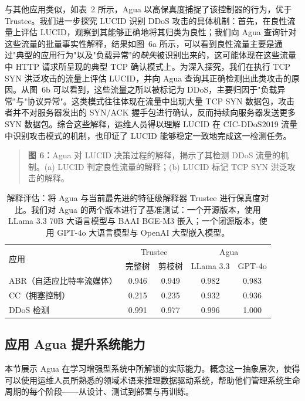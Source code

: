 \documentclass[11pt,a4paper]{article}
\begin{document}
与其他应用类似，如表~2 所示，Agua 以高保真度捕捉了该控制器的行为，优于 Trustee。我们进一步探究 LUCID 识别 DDoS 攻击的具体机制：首先，在良性流量上评估 LUCID，观察到其能够正确地将其归类为良性；我们向 Agua 查询针对这些流量的批量事实性解释，结果如图~6a 所示，可以看到良性流量主要是通过"典型的应用行为"以及"负载异常"的\emph{缺失}被识别出来的，这可能体现在这些流量中 HTTP 请求所呈现的典型 TCP 确认模式上。为深入探究，我们在执行 TCP SYN 洪泛攻击的流量上评估 LUCID，并向 Agua 查询其正确检测出此类攻击的原因。从图~6b 可以看到，这些流量之所以被标记为 DDoS，主要归因于"负载异常"与"协议异常"。这类模式往往体现在流量中出现大量 TCP SYN 数据包，攻击者并不对服务器发出的 SYN/ACK 握手包进行确认，反而持续向服务器发送更多 SYN 数据包。综合这些解释，运维人员得以理解 LUCID 在 CIC-DDoS2019 流量中识别攻击模式的机制，也印证了 LUCID 能够稳定一致地完成这一检测任务。

\begin{quote}\small\noindent\textbf{图 6：}Agua 对 LUCID 决策过程的解释，揭示了其检测 DDoS 流量的机制。(a) LUCID 判定良性流量的解释；(b) LUCID 标记 TCP SYN 洪泛攻击的解释。\end{quote}

\begin{table}[htbp]
\centering
\small
\caption{解释评估：将 Agua 与当前最先进的特征级解释器 Trustee 进行保真度对比。我们对 Agua 的两个版本进行了基准测试：一个开源版本，使用 LLama 3.3 70B 大语言模型与 BAAI BGE-M3 嵌入；一个闭源版本，使用 GPT-4o 大语言模型与 OpenAI 大型嵌入模型。}
\label{tab:fidelity}
\begin{tabular}{lcccc}
\toprule
\multirow{2}{*}{应用} & \multicolumn{2}{c}{Trustee} & \multicolumn{2}{c}{Agua} \\
 & 完整树 & 剪枝树 & LLama 3.3 & GPT-4o \\
\midrule
ABR（自适应比特率流媒体） & 0.946 & 0.949 & 0.982 & 0.983 \\
CC（拥塞控制） & 0.215 & 0.235 & 0.932 & 0.936 \\
DDoS 检测 & 0.991 & 0.977 & 0.996 & 1.000 \\
\bottomrule
\end{tabular}
\end{table}

\subsection{应用 Agua 提升系统能力}

本节展示 Agua 在学习增强型系统中所解锁的实际能力。概念这一抽象层次，使得可以使用运维人员所熟悉的领域术语来推理数据驱动系统，帮助他们管理系统生命周期的每个阶段——从设计、测试到部署与再训练。
\end{document}

